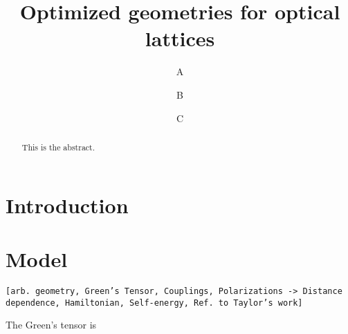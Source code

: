 \documentclass[aps,pra,superscriptaddress,twocolumn]{revtex4-1}
\newcommand{\eg}{e.\,g.,\ }
\newcommand{\fref}[1]{\text{Fig.}~\ref{#1}}
\newcommand{\eeref}[1]{\text{Eqs.}~\eqref{#1}}
\newcommand{\commentSB}[1]{\texttt{\color{blue}[#1]}}
\newcommand{\commentSO}[1]{\texttt{\color{orange}[#1]}}
\begin{document}
\title{Optimized geometries for optical lattices}
\author{A}
\author{B}
\author{C}

\begin{abstract}

This is the abstract. 

\end{abstract}

\maketitle

\section{Introduction}





\section{Model}
\commentSO{arb. geometry, Green's Tensor, Couplings, Polarizations -> Distance dependence, Hamiltonian, Self-energy, Ref. to Taylor's work}

The Green's tensor is 


\end{document}
